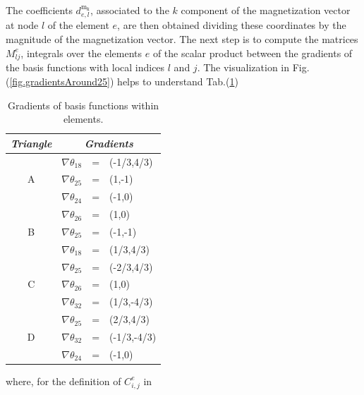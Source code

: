 \documentclass[11pt]{article}
\begin{document}
The coefficients $d^\mathrm{m_k}_{e,l}$, associated to the $k$
component of the magnetization vector at node $l$ of the element $e$,
are then obtained dividing these coordinates by the magnitude
of the magnetization vector. The next step is to compute the
matrices $M^e_{lj}$, integrals over the elements $e$ of the scalar
product between the gradients of the basis functions with local indices
$l$ and $j$. The visualization in Fig.(\ref{fig.gradientsAround25})
helps to understand Tab.(\ref{tab.gradientsBasisFunctions})
\begin{table}
  \begin{center}
    \begin{tabular}{|c|rcl|} 
      \hline
      \multicolumn{1}{|c}{\hspace{10pt} \textbf{\em Triangle}\hspace{10pt} } &
      \multicolumn{3}{c|}{\textbf{\em Gradients}} \\ 
      \hline \hline
      & \hspace{2cm} $\nabla \theta_{18}$ & = & (-1/3,4/3) \\
      A &  $\nabla \theta_{25}$ & = & (1,-1)  \\
      &  $\nabla \theta_{24}$ & = & (-1,0)  \\
      \hline
      & \hspace{2cm} $\nabla \theta_{26}$ & = & (1,0) \\
      B &  $\nabla \theta_{25}$ & = & (-1,-1)  \\
      &  $\nabla \theta_{18}$ & = & (1/3,4/3)  \\
      \hline
      & \hspace{2cm} $\nabla \theta_{25}$ & = & (-2/3,4/3) \\
      C &  $\nabla \theta_{26}$ & = & (1,0)  \\
      &  $\nabla \theta_{32}$ & = & (1/3,-4/3)  \\
      \hline
      & \hspace{2cm} $\nabla \theta_{25}$ & = & (2/3,4/3) \\
      D &  $\nabla \theta_{32}$ & = & (-1/3,-4/3)  \\
      &  $\nabla \theta_{24}$ & = & (-1,0)  \\
      \hline
    \end{tabular}
  \end{center}
  \caption[]{Gradients of basis functions within elements.}
  \label{tab.gradientsBasisFunctions}
\end{table}
where, for the definition of $C_{i,j}^e$ in
\end{document}
